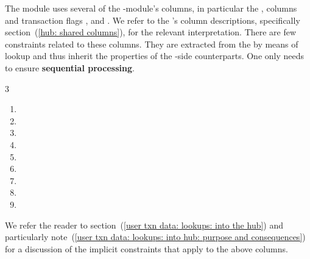 The \txnDataMod{} module uses several of the \hubMod{}-module's columns, in particular
the \totalTransactionNumber{}, \userTransactionNumber{} columns and transaction flags \sysi{}, \user{} and \sysf{}.
We refer to the \hubMod{}'s column descriptions,
specifically section~(\ref{hub: shared columns}),
for the relevant interpretation.
There are few constraints related to these columns.
They are extracted from the \hubMod{} by means of lookup and thus inherit the properties of the \hubMod{}-side counterparts.
One only needs to ensure \textbf{sequential processing}.
\begin{multicols}{3}
	\begin{enumerate}
		\item \blockNumber
		\item \totalTransactionNumber
		\item[\vspace{\fill}]
		\item \sysiTransactionNumber
		\item \userTransactionNumber
		\item \sysfTransactionNumber
		\item \sysi
		\item \user
		\item \sysf
	\end{enumerate}
\end{multicols}
\noindent We refer the reader to
section~(\ref{user txn data: lookups: into the hub}) and particularly
note~(\ref{user txn data: lookups: into hub: purpose and consequences})
for a discussion of the implicit constraints that apply to the above columns.


